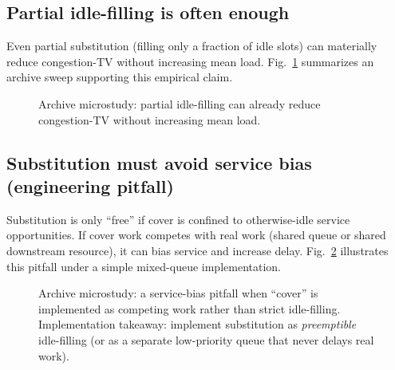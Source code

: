 \documentclass[11pt]{article}
\theoremstyle{definition}
\theoremstyle{remark}
\begin{document}
\subsection{Partial idle-filling is often enough}
Even partial substitution (filling only a fraction of idle slots) can materially reduce congestion-TV without increasing mean load.
Fig.~\ref{fig:idle} summarizes an archive sweep supporting this empirical claim.

\begin{figure}[t]
\centering
{}
\caption{Archive microstudy: partial idle-filling can already reduce congestion-TV without increasing mean load.}
\label{fig:idle}
\end{figure}

\subsection{Substitution must avoid service bias (engineering pitfall)}
Substitution is only ``free'' if cover is confined to otherwise-idle service opportunities.
If cover work competes with real work (shared queue or shared downstream resource), it can bias service and increase delay.
Fig.~\ref{fig:servicebias} illustrates this pitfall under a simple mixed-queue implementation.

\begin{figure}[t]
\centering
{}
\caption{Archive microstudy: a service-bias pitfall when ``cover'' is implemented as competing work rather than strict idle-filling.
Implementation takeaway: implement substitution as \emph{preemptible} idle-filling (or as a separate low-priority queue that never delays real work).}
\label{fig:servicebias}
\end{figure}
\end{document}
